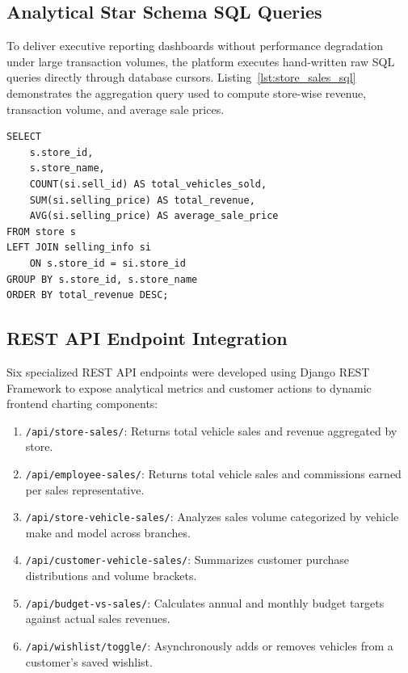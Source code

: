 \subsection{Analytical Star Schema SQL Queries}
To deliver executive reporting dashboards without performance degradation under large transaction volumes, the platform executes hand-written raw SQL queries directly through database cursors. Listing~\ref{lst:store_sales_sql} demonstrates the aggregation query used to compute store-wise revenue, transaction volume, and average sale prices.

\begin{tcolorbox}[title=\textbf{Listing 5.8: High-Performance Raw SQL Store Aggregation Query}, colback=gray!4, colframe=indigo!70!black, arc=2pt, boxrule=0.6pt, left=6pt, right=6pt, top=4pt, bottom=4pt]
\label{lst:store_sales_sql}
\footnotesize
\begin{verbatim}
SELECT 
    s.store_id,
    s.store_name,
    COUNT(si.sell_id) AS total_vehicles_sold,
    SUM(si.selling_price) AS total_revenue,
    AVG(si.selling_price) AS average_sale_price
FROM store s
LEFT JOIN selling_info si 
    ON s.store_id = si.store_id
GROUP BY s.store_id, s.store_name
ORDER BY total_revenue DESC;
\end{verbatim}
\end{tcolorbox}

\subsection{REST API Endpoint Integration}
Six specialized REST API endpoints were developed using Django REST Framework to expose analytical metrics and customer actions to dynamic frontend charting components:
\begin{enumerate}
    \item \texttt{/api/store-sales/}: Returns total vehicle sales and revenue aggregated by store.
    \item \texttt{/api/employee-sales/}: Returns total vehicle sales and commissions earned per sales representative.
    \item \texttt{/api/store-vehicle-sales/}: Analyzes sales volume categorized by vehicle make and model across branches.
    \item \texttt{/api/customer-vehicle-sales/}: Summarizes customer purchase distributions and volume brackets.
    \item \texttt{/api/budget-vs-sales/}: Calculates annual and monthly budget targets against actual sales revenues.
    \item \texttt{/api/wishlist/toggle/}: Asynchronously adds or removes vehicles from a customer's saved wishlist.
\end{enumerate}


